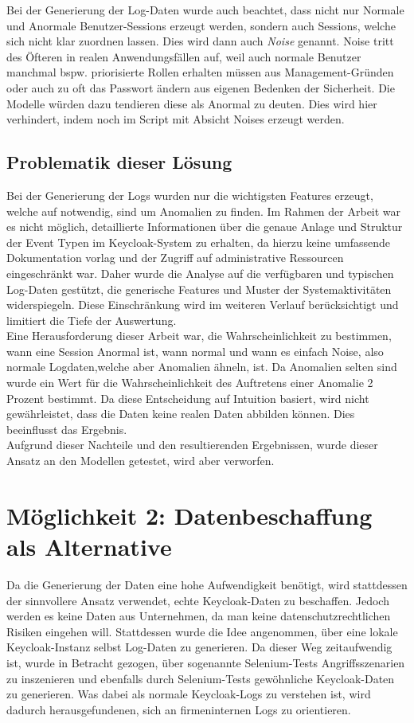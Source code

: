 \documentclass[a4paper,12pt]{article}
\begin{document}
	Bei der Generierung der Log-Daten wurde auch beachtet, dass nicht nur Normale und Anormale Benutzer-Sessions erzeugt werden, sondern auch Sessions, welche sich nicht klar zuordnen lassen. Dies wird dann auch \textit{Noise} genannt. Noise tritt des Öfteren in realen Anwendungsfällen auf, weil auch normale Benutzer manchmal bspw. priorisierte Rollen erhalten müssen aus Management-Gründen oder auch zu oft das Passwort ändern aus eigenen Bedenken der Sicherheit. Die Modelle würden dazu tendieren diese als Anormal zu deuten. Dies wird hier verhindert, indem noch im Script mit Absicht Noises erzeugt werden.
	
	\subsection{Problematik dieser Lösung}
	Bei der Generierung der Logs wurden nur die wichtigsten Features erzeugt, welche auf notwendig, sind um Anomalien zu finden. Im Rahmen der Arbeit war es nicht möglich, detaillierte Informationen über die genaue Anlage und Struktur der Event Typen im Keycloak-System zu erhalten, da hierzu keine umfassende Dokumentation vorlag und der Zugriff auf administrative Ressourcen eingeschränkt war. Daher wurde die Analyse auf die verfügbaren und typischen Log-Daten gestützt, die generische Features und Muster der Systemaktivitäten widerspiegeln. Diese Einschränkung wird im weiteren Verlauf berücksichtigt und limitiert die Tiefe der Auswertung.
	\\[0.5em]
	Eine Herausforderung dieser Arbeit war, die Wahrscheinlichkeit zu bestimmen, wann eine Session Anormal ist, wann normal und wann es einfach Noise, also normale Logdaten,welche aber Anomalien ähneln, ist. Da Anomalien selten sind wurde ein Wert für die Wahrscheinlichkeit des Auftretens einer Anomalie 2 Prozent bestimmt. Da diese Entscheidung auf Intuition basiert, wird nicht gewährleistet, dass die Daten keine realen Daten abbilden können. Dies beeinflusst das Ergebnis.
	\\[0.5em]
	Aufgrund dieser Nachteile und den resultierenden Ergebnissen, wurde dieser Ansatz an den Modellen getestet, wird aber verworfen.
	
	\section{Möglichkeit 2: Datenbeschaffung als Alternative}
	Da die Generierung der Daten eine hohe Aufwendigkeit benötigt, wird stattdessen der sinnvollere Ansatz verwendet, echte Keycloak-Daten zu beschaffen. Jedoch werden es keine Daten aus Unternehmen, da man keine datenschutzrechtlichen Risiken eingehen will. Stattdessen wurde die Idee angenommen, über eine lokale Keycloak-Instanz selbst Log-Daten zu generieren. Da dieser Weg zeitaufwendig ist, wurde in Betracht gezogen, über sogenannte Selenium-Tests Angriffsszenarien zu inszenieren und ebenfalls durch Selenium-Tests gewöhnliche Keycloak-Daten zu generieren. Was dabei als normale Keycloak-Logs zu verstehen ist, wird dadurch  herausgefundenen, sich an firmeninternen Logs zu orientieren.
	
\end{document}
